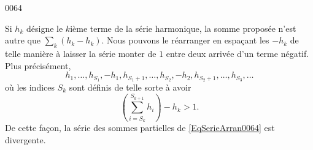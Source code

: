 
\begin{corrige}{0064}

Si $h_k$ désigne le $k$ième terme de la série harmonique, la somme proposée n'est autre que $\sum_k(h_k-h_k)$. Nous pouvons le réarranger en espaçant les $-h_k$ de telle manière à laisser la série monter de $1$ entre deux arrivée d'un terme négatif. Plus précisément,
\begin{equation}		\label{EqSerieArran0064}
	h_1,\ldots,h_{S_1},-h_1,h_{S_1+1},\ldots,h_{S_2},-h_2,h_{S_2+1},\ldots,h_{S_3},\ldots	
\end{equation}
où les indices $S_k$ sont définis de telle sorte à avoir
\begin{equation}
	(\sum_{i=S_k}^{S_{k+1}}h_i)-h_k>1.
\end{equation}
De cette façon, la série des sommes partielles de \eqref{EqSerieArran0064} est divergente.

\end{corrige}
